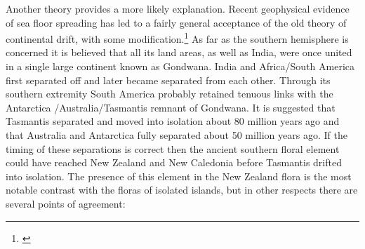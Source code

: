 Another theory provides a more likely explanation.
Recent geophysical evidence of sea floor spreading has led to a fairly general acceptance of the old theory of continental drift, with some modification.\footnote{\cite{stevens1980new}}
As far as the southern hemisphere is concerned it is believed that all its land areas, as well as India, were once united in a single large continent known as Gondwana.
India and Africa/South America first separated off and later became separated from each other.
Through its southern extremity South America probably retained tenuous links with the Antarctica /Australia/Tasmantis remnant of Gondwana.
It is suggested that Tasmantis separated and moved into isolation about 80 million years ago and that Australia and Antarctica fully separated about 50 million years ago.
If the timing of these separations is correct then the ancient southern floral element could have reached New Zealand and New Caledonia before Tasmantis drifted into isolation.
The presence of this element in the New Zealand flora is the most notable contrast with the floras of isolated islands, but in other respects there are several points of agreement:


